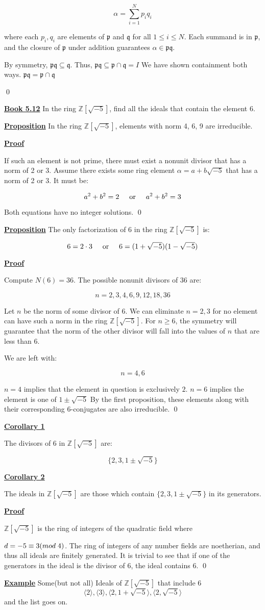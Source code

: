 \documentclass{article}
\newcommand{\new}[1]{
    \vspace{2mm}
    \noindent
    \textbf{
    \underline{#1}}
}
\def\ZZ{{\mathbb{Z}}}
\def\_{{\hspace{1mm}}}
\newcommand{\Proof}{{
    \vspace{2mm}
    \noindent
    \textbf{
    \underline{Proof}}
}
}
\newcommand{\textOr}{
    \hspace{5mm}
    \textrm{or}
    \hspace{5mm}
}
\newcommand{\<}{{
    \langle
}}
\def\>{{
    \rangle
}}
\def\ZZ{{\mathbb{Z}}}
\newcommand{\pideal}{
    {{\mathfrak{p}}}
}
\newcommand{\qideal}{
    {{\mathfrak{q}}}
}
\begin{document}
\[
    \alpha = \sum_{i = 1}^{N} p_iq_i 
\]

where each $p_i, q_i$ are elements of $\pideal$ and $\qideal$ for 
all $1\leq i \leq N$. Each summand is in $\pideal$, and the closure 
of $\pideal$ under addition guarantees $\alpha \in \pideal \qideal$. 

By symmetry, $\pideal \qideal \subseteq \qideal$. Thus, $\pideal \qideal \subseteq \pideal \cap \qideal = I$
We have shown containment both ways. $\pideal \qideal = \pideal \cap \qideal$

\qed

\new{Book 5.12} In the ring $\ZZ[\sqrt{-5}]$, find all the ideals 
that contain the element $6$. 

\new{Proposition} In the ring $\ZZ[\sqrt{-5}]$, elements with norm 
4, 6, 9 are irreducible. 

\Proof
If such an element is not prime, there must exist a nonunit divisor 
that has a norm of 2 or 3. Assume there exists some ring element 
$\alpha = a+b\sqrt{-5}$ that has a norm of 2 or 3. It must be:

\[
    a^2+b^2 = 2 \textOr a^2+b^2=3
\]

Both equations have no integer solutions. \qed

\new{Proposition} The only factorization of 6 in the ring 
$\ZZ[\sqrt{-5}]$ is:

\[
    6 = 2\cdot 3 \textOr 6 = (1+\sqrt{-5})(1-\sqrt{-5})
\]

\Proof
Compute $N(6) = 36$. The possible nonunit divisors of 36 are:

\[n = 2, 3, 4, 6, 9, 12, 18, 36\]

Let $n$ be the norm of some divisor of 6. We can 
eliminate $n = 2, 3$ for no element can have such a norm 
in the ring $\ZZ[\sqrt{-5}]$. For $n \geq 6$, the symmetry will 
guarantee that the norm of the other divisor will fall into 
the values of $n$ that are less than 6. 

We are left with:

\[
    n = 4, 6
\]

$n = 4$ implies that the element in question is exclusively 
$2$. $n = 6$ implies the element is one of $1 \pm \sqrt{-5}$
By the first proposition, these elements along with their 
corresponding 6-conjugates are also irreducible. \qed

\new{Corollary 1}
The divisors of 6 in $\ZZ[\sqrt{-5}]$ are:

\[
    \{2, 3, 1\pm\sqrt{-5}\}
\]

\new{Corollary 2}
The ideals in $\ZZ[{\sqrt{-5}}]$ are those 
which contain $\{2, 3, 1\pm\sqrt{-5}\}$ in its generators. 

\Proof 
$\ZZ[\sqrt{-5}]$ is the ring of integers of the quadratic field 
where 

$d = -5 \equiv 3 (mod\_4)$. The ring of integers of any number 
fields are noetherian, and thus all ideals are finitely generated. 
It is trivial to see that if one of the generators in the ideal 
is the divisor of 6, the ideal contains 6. \qed 

\new{Example} Some(but not all) Ideals of $\ZZ[\sqrt{-5}]$ that include 6
\[
    \<2\>, \<3\>, \<2, 1+\sqrt{-5}\>, \<2, \sqrt{-5}\>
\]
and the list goes on. 
\end{document}
